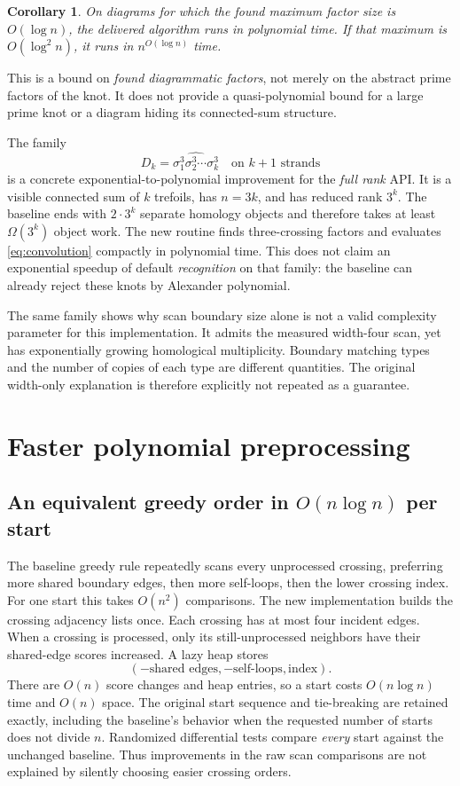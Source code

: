 \documentclass[11pt,letterpaper]{article}
\newtheorem{corollary}[theorem]{Corollary}
\theoremstyle{definition}\newtheorem{definition}[theorem]{Definition}
\theoremstyle{remark}\newtheorem{remark}[theorem]{Remark}
\begin{document}
\begin{corollary}
On diagrams for which the found maximum factor size is $O(\log n)$, the delivered
algorithm runs in polynomial time. If that maximum is $O(\log^2 n)$, it runs in
$n^{O(\log n)}$ time.
\end{corollary}

This is a bound on \emph{found diagrammatic factors}, not merely on the abstract
prime factors of the knot. It does not provide a quasi-polynomial bound for a
large prime knot or a diagram hiding its connected-sum structure.

The family
\[
 D_k=\widehat{\sigma_1^3\sigma_2^3\cdots\sigma_k^3}
 \quad\text{on }k+1\text{ strands}
\]
is a concrete exponential-to-polynomial improvement for the \emph{full rank}
API. It is a visible connected sum of $k$ trefoils, has $n=3k$, and has reduced
rank $3^k$. The baseline ends with $2\cdot3^k$ separate homology objects and
therefore takes at least $\Omega(3^k)$ object work. The new routine finds
three-crossing factors and evaluates \eqref{eq:convolution} compactly in
polynomial time. This does not claim an exponential speedup of default
\emph{recognition} on that family: the baseline can already reject these knots
by Alexander polynomial.

The same family shows why scan boundary size alone is not a valid complexity
parameter for this implementation. It admits the measured width-four scan, yet
has exponentially growing homological multiplicity. Boundary matching types and
the number of copies of each type are different quantities. The original
width-only explanation is therefore explicitly not repeated as a guarantee.

\section{Faster polynomial preprocessing}

\subsection{An equivalent greedy order in \texorpdfstring{$O(n\log n)$}{O(n log n)} per start}

The baseline greedy rule repeatedly scans every unprocessed crossing, preferring
more shared boundary edges, then more self-loops, then the lower crossing index.
For one start this takes $O(n^2)$ comparisons. The new implementation builds the
crossing adjacency lists once. Each crossing has at most four incident edges.
When a crossing is processed, only its still-unprocessed neighbors have their
shared-edge scores increased. A lazy heap stores
\[
 (-\text{shared edges},-\text{self-loops},\text{index}).
\]
There are $O(n)$ score changes and heap entries, so a start costs
$O(n\log n)$ time and $O(n)$ space. The original start sequence and tie-breaking
are retained exactly, including the baseline's behavior when the requested
number of starts does not divide $n$. Randomized differential tests compare
\emph{every} start against the unchanged baseline. Thus improvements in the raw
scan comparisons are not explained by silently choosing easier crossing orders.
\end{document}
